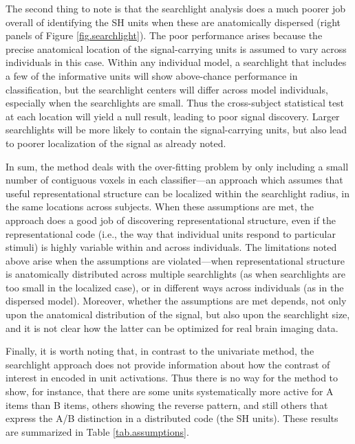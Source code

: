 The second thing to note is that the searchlight analysis does a much poorer job overall of identifying the SH units when these are anatomically dispersed (right panels of Figure \ref{fig.searchlight}). The poor performance arises because the precise anatomical location of the signal-carrying units is assumed to vary across individuals in this case. Within any individual model, a searchlight that includes a few of the informative units will show above-chance performance in classification, but the searchlight centers will differ across model individuals, especially when the searchlights are small. Thus the cross-subject statistical test at each location will yield a null result, leading to poor signal discovery. Larger searchlights will be more likely to contain the signal-carrying units, but also lead to poorer localization of the signal as already noted. 

In sum, the method deals with the over-fitting problem by only including a small number of contiguous voxels in each classifier---an approach which assumes that useful representational structure can be localized within the searchlight radius, in the same locations across subjects. When these assumptions are met, the approach does a good job of discovering representational structure, even if the representational code (i.e., the way that individual units respond to particular stimuli) is highly variable within and across individuals. The limitations noted above arise when the assumptions are violated---when representational structure is anatomically distributed across multiple searchlights (as when searchlights are too small in the localized case), or in different ways across individuals (as in the dispersed model). Moreover, whether the assumptions are met depends, not only upon the anatomical distribution of the signal, but also upon the searchlight size, and it is not clear how the latter can be optimized for real brain imaging data.  

Finally, it is worth noting that, in contrast to the univariate method, the searchlight approach does not provide information about how the contrast of interest in encoded in unit activations. Thus there is no way for the method to show, for instance, that there are some units systematically more active for A items than B items, others showing the reverse pattern, and still others that express the A/B distinction in a distributed code (the SH units). These results are summarized in Table \ref{tab.assumptions}.